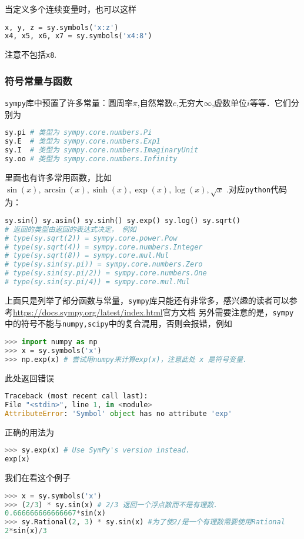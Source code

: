 当定义多个连续变量时，也可以这样
\begin{lstlisting}[language=python]
 x, y, z = sy.symbols('x:z')
x4, x5, x6, x7 = sy.symbols('x4:8')
\end{lstlisting}
注意不包括\verb|x8|.

\subsubsection{符号常量与函数}
\verb|sympy|库中预置了许多常量：圆周率$\pi$,自然常数$e$,无穷大$\infty$,虚数单位$i$等等．它们分别为
\begin{lstlisting}[language=python]
sy.pi # 类型为 sympy.core.numbers.Pi
sy.E  # 类型为 sympy.core.numbers.Exp1
sy.I  # 类型为 sympy.core.numbers.ImaginaryUnit
sy.oo # 类型为 sympy.core.numbers.Infinity 
\end{lstlisting}
里面也有许多常用函数，比如 $\sin(x), \arcsin(x), \sinh(x), \exp(x), \log(x),\sqrt{x}$ .对应\verb|python|代码为：
\begin{lstlisting}[language=python]
sy.sin() sy.asin() sy.sinh() sy.exp() sy.log() sy.sqrt()
# 返回的类型由返回的表达式决定， 例如
# type(sy.sqrt(2)) = sympy.core.power.Pow
# type(sy.sqrt(4)) = sympy.core.numbers.Integer
# type(sy.sqrt(8)) = sympy.core.mul.Mul
# type(sy.sin(sy.pi)) = sympy.core.numbers.Zero
# type(sy.sin(sy.pi/2)) = sympy.core.numbers.One
# type(sy.sin(sy.pi/4)) = sympy.core.mul.Mul
\end{lstlisting}
上面只是列举了部分函数与常量，\verb|sympy|库只能还有非常多，感兴趣的读者可以参考\href{https://docs.sympy.org/latest/index.html#}{https://docs.sympy.org/latest/index.html}{官方文档}
另外需要注意的是，\verb|sympy|中的符号不能与\verb|numpy,scipy|中的复合混用，否则会报错，例如
\begin{lstlisting}[language=python]
>>> import numpy as np
>>> x = sy.symbols('x')
>>> np.exp(x) # 尝试用numpy来计算exp(x)，注意此处 x 是符号变量.
\end{lstlisting}
此处返回错误
\begin{lstlisting}[language=python]
Traceback (most recent call last):
File "<stdin>", line 1, in <module>
AttributeError: 'Symbol' object has no attribute 'exp'
\end{lstlisting}
正确的用法为
\begin{lstlisting}[language=python]
>>> sy.exp(x) # Use SymPy's version instead.
exp(x)
\end{lstlisting}
我们在看这个例子
\begin{lstlisting}[language=python]
>>> x = sy.symbols('x')
>>> (2/3) * sy.sin(x) # 2/3 返回一个浮点数而不是有理数.
0.666666666666667*sin(x)
>>> sy.Rational(2, 3) * sy.sin(x) #为了使2/是一个有理数需要使用Rational
2*sin(x)/3
\end{lstlisting}
